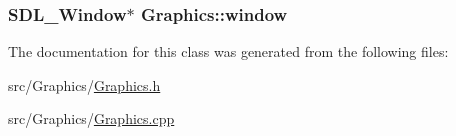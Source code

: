 \subsubsection[{\texorpdfstring{window}{window}}]{\setlength{\rightskip}{0pt plus 5cm}S\+D\+L\+\_\+\+Window$\ast$ Graphics\+::window}\hypertarget{class_graphics_af397f61e26b41302b0b66ee4ab408952}{}\label{class_graphics_af397f61e26b41302b0b66ee4ab408952}


The documentation for this class was generated from the following files\+:\begin{DoxyCompactItemize}
\item 
src/\+Graphics/\hyperlink{_graphics_8h}{Graphics.\+h}\item 
src/\+Graphics/\hyperlink{_graphics_8cpp}{Graphics.\+cpp}\end{DoxyCompactItemize}
